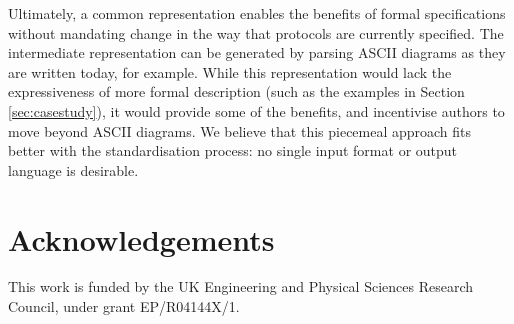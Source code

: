 \documentclass[10pt,sigconf]{acmart}
\begin{document}
Ultimately, a common representation enables the benefits of formal specifications without
mandating change in the way that protocols are currently specified. The intermediate
representation can be generated by parsing ASCII diagrams as they are written today, for
example. While this representation would lack the expressiveness of more formal
description (such as the examples in Section \ref{sec:casestudy}), it would provide some
of the benefits, and incentivise authors to move beyond ASCII diagrams. We believe that
this piecemeal approach fits better with the standardisation process: no single input
format or output language is desirable.

\section*{Acknowledgements}
\footnotesize

This work is funded by the UK Engineering and Physical Sciences Research Council, under
grant EP/R04144X/1.

\balance


\end{document}
